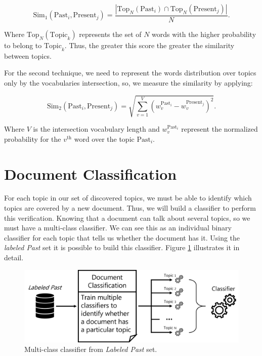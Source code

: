\begin{equation}
	\label{eq:top-n-match}
	\text{Sim}_{1}\left(\text{Past}_{i}, \text{Present}_{j}\right) = \dfrac{|\text{Top}_{N}(\text{Past}_{i}) \cap \text{Top}_{N}(\text{Present}_{j})|}{N} \text{.}
\end{equation}

Where $\text{Top}_{N}(\text{Topic}_{k})$ represents the set of $N$ words with the higher probability to belong to $\text{Topic}_{k}$. Thus, the greater this score the greater the similarity between topics.

For the second technique, we need to represent the words distribution over topics only by the vocabularies intersection, so, we measure the similarity by applying:

\begin{equation}
	\label{eq:global-match}
	\text{Sim}_{2}\left(\text{Past}_{i}, \text{Present}_{j}\right) = \sqrt{\sum_{v=1}^{V} \left(w_{v}^{\text{Past}_{i}} - w_{v}^{\text{Present}_{j}}\right)^2} \text{.}
\end{equation}

Where $V$ is the intersection vocabulary length and $w_{v}^{\text{Past}_{i}}$ represent the normalized probability for the $v^{\text{th}}$ word over the topic $\text{Past}_{i}$.

\section{Document Classification}

For each topic in our set of discovered topics, we must be able to identify which topics are covered by a new document. Thus, we will build a classifier to perform this verification. Knowing that a document can talk about several topics, so we must have a multi-class classifier. We can see this as an individual binary classifier for each topic that tells us whether the document has it. Using the \textit{labeled Past} set it is possible to build this classifier. Figure \ref{fig:document-classification} illustrates it in detail.

\begin{figure}[h!]
	\centering
	\includegraphics[width=0.9\linewidth]{01.Chapters/04.Materials/document-classification}
	\caption{Multi-class classifier from \textit{Labeled Past} set.}
	\label{fig:document-classification}
\end{figure}

